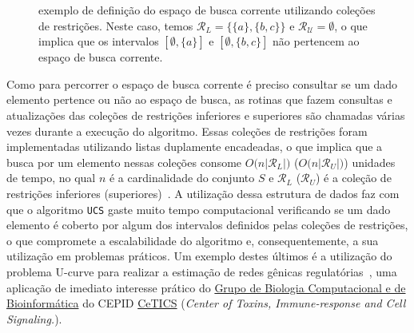 \documentclass[12pt]{article}
\begin{document}
\begin{figure}[!ht]
  \centering 
  \caption{exemplo de definição do espaço de busca corrente utilizando coleções de restrições. Neste caso, temos $\mathcal{R}_L = \{ \{a\}, \{ b,c \}\}$ e $\mathcal{R_U} = \emptyset$, o que implica que os intervalos $[\emptyset, \{a\}]$ e $[\emptyset, \{b,c\}]$ não pertencem ao espaço de busca corrente.} 
  \label{fig:lower_restriction} 
\end{figure}


Como para percorrer o espaço de busca corrente é preciso consultar se um dado elemento pertence ou não ao espaço de busca, as rotinas que fazem consultas e atualizações das coleções de restrições inferiores e superiores são chamadas várias vezes durante a execução do algoritmo. Essas coleções de restrições foram implementadas utilizando listas duplamente encadeadas, o que implica que a busca por um elemento nessas coleções consome \begin{math}O(n|\end{math}$\mathcal{R}_L$\begin{math}|)\end{math} (\begin{math}O(n|\end{math}$\mathcal{R}_U$\begin{math}|)\end{math}) unidades de tempo, no qual \begin{math}n\end{math} é a cardinalidade do conjunto \begin{math}S\end{math} e $\mathcal{R}_L$ ($\mathcal{R}_U$) é a coleção de restrições inferiores (superiores)~\cite{msreis thesis}. A utilização dessa estrutura de dados faz com que o algoritmo {\tt UCS} gaste muito tempo computacional verificando se um dado elemento é coberto por algum dos intervalos definidos pelas coleções de restrições, o que compromete a escalabilidade do algoritmo e, consequentemente, a sua utilização em problemas práticos. Um exemplo destes últimos é a utilização do problema U-curve para realizar a estimação de redes gênicas regulatórias~\cite{u-curve algorithm}, uma aplicação de imediato interesse prático do \href{http://cetics.butantan.gov.br/en/platforms/computational-biology}{Grupo de Biologia Computacional e de Bioinformática} do CEPID \href{http://cetics.butantan.gov.br/en}{CeTICS} ({\em Center of Toxins, Immune-response and Cell Signaling.}).
\end{document}

